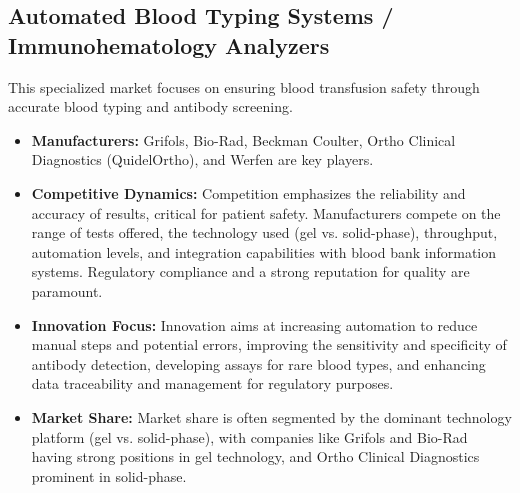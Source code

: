 \documentclass{article}
\begin{document}
\subsection{Automated Blood Typing Systems / Immunohematology Analyzers}
This specialized market focuses on ensuring blood transfusion safety through accurate blood typing and antibody screening.
\begin{itemize}
    \item \textbf{Manufacturers:} Grifols, Bio-Rad, Beckman Coulter, Ortho Clinical Diagnostics (QuidelOrtho), and Werfen are key players.
    \item \textbf{Competitive Dynamics:} Competition emphasizes the reliability and accuracy of results, critical for patient safety. Manufacturers compete on the range of tests offered, the technology used (gel vs. solid-phase), throughput, automation levels, and integration capabilities with blood bank information systems. Regulatory compliance and a strong reputation for quality are paramount.
    \item \textbf{Innovation Focus:} Innovation aims at increasing automation to reduce manual steps and potential errors, improving the sensitivity and specificity of antibody detection, developing assays for rare blood types, and enhancing data traceability and management for regulatory purposes.
    \item \textbf{Market Share:} Market share is often segmented by the dominant technology platform (gel vs. solid-phase), with companies like Grifols and Bio-Rad having strong positions in gel technology, and Ortho Clinical Diagnostics prominent in solid-phase.
\end{itemize}
\end{document}
